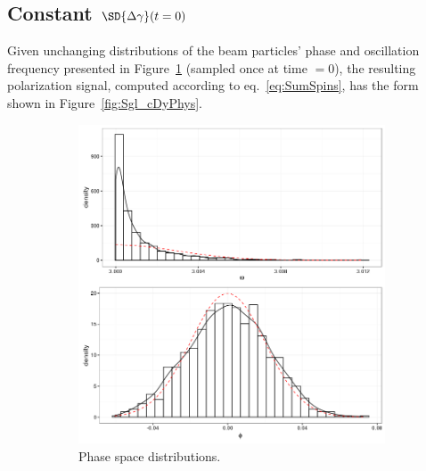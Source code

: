 \documentclass{article}
\begin{document}
\subsection{Constant $\SD{\dy}(t=0)$}
Given unchanging distributions of the beam particles' phase and oscillation frequency presented in Figure~\ref{fig:PSdist_cDy} (sampled once at time $=0$), the resulting polarization signal, computed according to eq.~\eqref{eq:SumSpins}, has the form shown in Figure~\ref{fig:Sgl_cDyPhys}.
\begin{figure}[h]
	\begin{subfigure}[b]{.45\textwidth}
		\centering
		\includegraphics[scale=.5]{../img/PS_dist}
		\caption{Phase space distributions.\label{fig:PSdist_cDy}}
	\end{subfigure}~~~~~~~~
	\begin{subfigure}[b]{.45\textwidth}
		\centering

\end{subfigure}
\end{figure}
\end{document}
